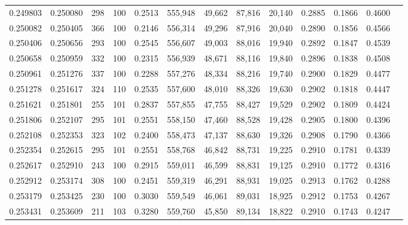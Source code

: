 \begin{tabular}{rrrrrrrrrrrrr}
0.249803 & 0.250080 &   298 & 100 &                                     0.2513 & 555,948 &  49,662 &  87,816 &  20,140 & 0.2885 & 0.1866 & 0.4600 \\
0.250082 & 0.250405 &   366 & 100 &                                     0.2146 & 556,314 &  49,296 &  87,916 &  20,040 & 0.2890 & 0.1856 & 0.4566 \\
0.250406 & 0.250656 &   293 & 100 &                                     0.2545 & 556,607 &  49,003 &  88,016 &  19,940 & 0.2892 & 0.1847 & 0.4539 \\
0.250658 & 0.250959 &   332 & 100 &                                     0.2315 & 556,939 &  48,671 &  88,116 &  19,840 & 0.2896 & 0.1838 & 0.4508 \\
0.250961 & 0.251276 &   337 & 100 &                                     0.2288 & 557,276 &  48,334 &  88,216 &  19,740 & 0.2900 & 0.1829 & 0.4477 \\
0.251278 & 0.251617 &   324 & 110 &                                     0.2535 & 557,600 &  48,010 &  88,326 &  19,630 & 0.2902 & 0.1818 & 0.4447 \\
0.251621 & 0.251801 &   255 & 101 &                                     0.2837 & 557,855 &  47,755 &  88,427 &  19,529 & 0.2902 & 0.1809 & 0.4424 \\
0.251806 & 0.252107 &   295 & 101 &                                     0.2551 & 558,150 &  47,460 &  88,528 &  19,428 & 0.2905 & 0.1800 & 0.4396 \\
0.252108 & 0.252353 &   323 & 102 &                                     0.2400 & 558,473 &  47,137 &  88,630 &  19,326 & 0.2908 & 0.1790 & 0.4366 \\
0.252354 & 0.252615 &   295 & 101 &                                     0.2551 & 558,768 &  46,842 &  88,731 &  19,225 & 0.2910 & 0.1781 & 0.4339 \\
0.252617 & 0.252910 &   243 & 100 &                                     0.2915 & 559,011 &  46,599 &  88,831 &  19,125 & 0.2910 & 0.1772 & 0.4316 \\
0.252912 & 0.253174 &   308 & 100 &                                     0.2451 & 559,319 &  46,291 &  88,931 &  19,025 & 0.2913 & 0.1762 & 0.4288 \\
0.253179 & 0.253425 &   230 & 100 &                                     0.3030 & 559,549 &  46,061 &  89,031 &  18,925 & 0.2912 & 0.1753 & 0.4267 \\
0.253431 & 0.253609 &   211 & 103 &                                     0.3280 & 559,760 &  45,850 &  89,134 &  18,822 & 0.2910 & 0.1743 & 0.4247 \\

\end{tabular}
